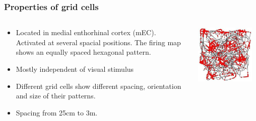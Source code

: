 \documentclass[mathserif]{beamer}
\begin{document}
\begin{frame}
\frametitle{Properties of grid cells}
\begin{columns}[T]
    \begin{column}{.5\textwidth}
			\begin{itemize}
			\item Located in  medial enthorhinal cortex (mEC). Activated at several spacial positions. The firing map shows an equally spaced hexagonal pattern. 
			\item Mostly independent of visual stimulus
			\item Different grid cells show different spacing, orientation and size of their patterns.
			\item Spacing from 25cm to 3m. 
			\end{itemize}
    \end{column}
    \begin{column}{.5\textwidth}
    \includegraphics[width= 0.9\textwidth]{RatRunningPath.JPG}
    \end{column}
  \end{columns}	
\end{frame}
%
%
\end{document}
